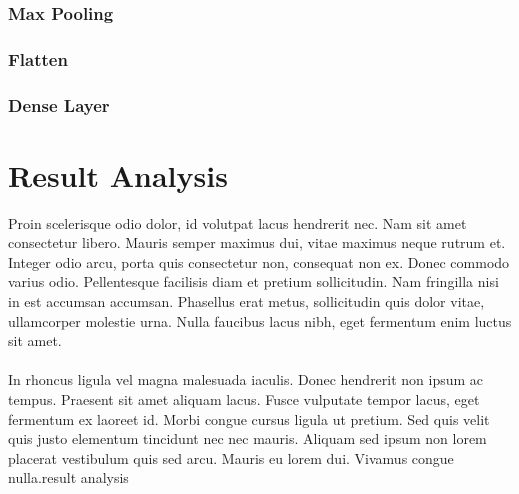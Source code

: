 \documentclass[journal]{IEEEtran}
\begin{document}
\subsubsection{Max Pooling}
\subsubsection{Flatten}
\subsubsection{Dense Layer}
%
%
\section{Result Analysis}
Proin scelerisque odio dolor, id volutpat lacus hendrerit nec. Nam sit amet consectetur libero. Mauris semper maximus dui, vitae maximus neque rutrum et. Integer odio arcu, porta quis consectetur non, consequat non ex. Donec commodo varius odio. Pellentesque facilisis diam et pretium sollicitudin. Nam fringilla nisi in est accumsan accumsan. Phasellus erat metus, sollicitudin quis dolor vitae, ullamcorper molestie urna. Nulla faucibus lacus nibh, eget fermentum enim luctus sit amet.\\\\In rhoncus ligula vel magna malesuada iaculis. Donec hendrerit non ipsum ac tempus. Praesent sit amet aliquam lacus. Fusce vulputate tempor lacus, eget fermentum ex laoreet id. Morbi congue cursus ligula ut pretium. Sed quis velit quis justo elementum tincidunt nec nec mauris. Aliquam sed ipsum non lorem placerat vestibulum quis sed arcu. Mauris eu lorem dui. Vivamus congue nulla.result analysis
\ifCLASSOPTIONcaptionsoff
  \newpage
\fi


\vfill
\end{document}
